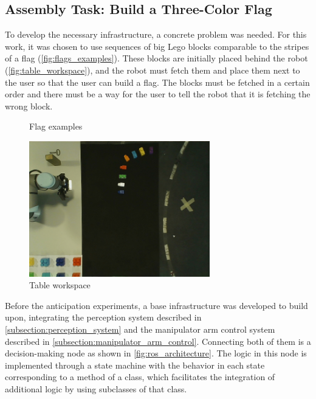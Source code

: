 \subsection{Assembly Task: Build a Three-Color Flag}

To develop the necessary infrastructure, a concrete problem was needed. For this work, it was chosen to use sequences of big Lego blocks comparable to the stripes of a flag (\autoref{fig:flags_examples}). These blocks are initially placed behind the robot (\autoref{fig:table_workspace}), and the robot must fetch them and place them next to the user so that the user can build a flag. The blocks must be fetched in a certain order and there must be a way for the user to tell the robot that it is fetching the wrong block.

\begin{figure}[ht]
    \centering
    
    \caption{Flag examples}
    \label{fig:flags_examples}
\end{figure}

\begin{figure}[ht]
    \centerline{\includegraphics[width=0.7\textwidth]{figs/table_workspace.jpg}}
    \caption{Table workspace}
    \label{fig:table_workspace}
\end{figure}

Before the anticipation experiments, a base infrastructure was developed to build upon, integrating the perception system described in \autoref{subsection:perception_system} and the manipulator arm control system described in \autoref{subsection:manipulator_arm_control}. Connecting both of them is a decision-making node as shown in \autoref{fig:ros_architecture}. The logic in this node is implemented through a state machine with the behavior in each state corresponding to a method of a class, which facilitates the integration of additional logic by using subclasses of that class.

